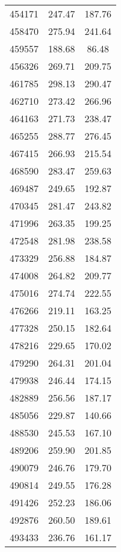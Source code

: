 \documentclass[main.tex]{subfiles}
\begin{document}
\begin{longtable}{ccc}
		454171     & 247.47       & 187.76       \\
		458470     & 275.94       & 241.64       \\
		459557     & 188.68       & 86.48        \\
		456326     & 269.71       & 209.75       \\
		461785     & 298.13       & 290.47       \\
		462710     & 273.42       & 266.96       \\
		464163     & 271.73       & 238.47       \\
		465255     & 288.77       & 276.45       \\
		467415     & 266.93       & 215.54       \\
		468590     & 283.47       & 259.63       \\
		469487     & 249.65       & 192.87       \\
		470345     & 281.47       & 243.82       \\
		471996     & 263.35       & 199.25       \\
		472548     & 281.98       & 238.58       \\
		473329     & 256.88       & 184.87       \\
		474008     & 264.82       & 209.77       \\
		475016     & 274.74       & 222.55       \\
		476266     & 219.11       & 163.25       \\
		477328     & 250.15       & 182.64       \\
		478216     & 229.65       & 170.02       \\
		479290     & 264.31       & 201.04       \\
		479938     & 246.44       & 174.15       \\
		482889     & 256.56       & 187.17       \\
		485056     & 229.87       & 140.66       \\
		488530     & 245.53       & 167.10       \\
		489206     & 259.90       & 201.85       \\
		490079     & 246.76       & 179.70       \\
		490814     & 249.55       & 176.28       \\
		491426     & 252.23       & 186.06       \\
		492876     & 260.50       & 189.61       \\
		493433     & 236.76       & 161.17       \\

\end{longtable}
\end{document}
